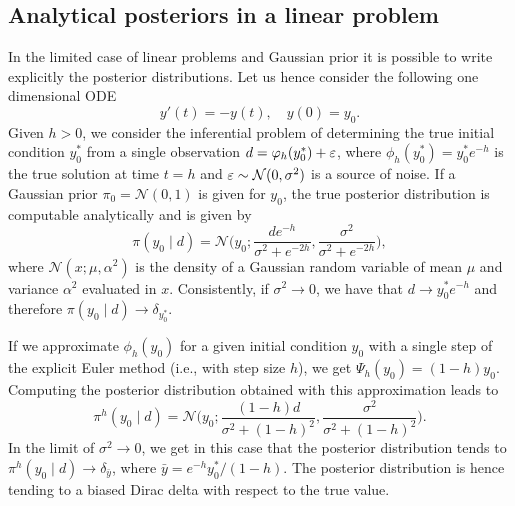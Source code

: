 \documentclass[10pt]{article}
\begin{document}
\subsection{Analytical posteriors in a linear problem}\label{sec:AnalyticalPosterior} In the limited case of linear problems and Gaussian prior it is possible to write explicitly the posterior distributions. Let us hence consider the following one dimensional ODE
\begin{equation}
	y'(t) = -y(t), \quad y(0) = y_0.
\end{equation}
Given $h > 0$, we consider the inferential problem of determining the true initial condition $y_0^*$ from a single observation $d = \varphi_h(y_0^*) + \varepsilon$, where $\phi_h(y_0^*) = y_0^*e^{-h}$ is the true solution at time $t =  h$ and $\varepsilon \sim \mathcal N (0, \sigma^2)$ is a source of noise. If a Gaussian prior $\pi_0 = \mathcal N(0, 1)$ is given for $y_0$, the true posterior distribution is computable analytically and is given by
\begin{equation}\label{eq:ExPosteriorEx}
	\pi(y_0 \mid d) = \mathcal N\Big(y_0; \frac{de^{-h}}{\sigma^2 + e^{-2h}}, \frac{\sigma^2}{\sigma^2 + e^{-2h}}\Big),
\end{equation}
where $\mathcal N(x; \mu, \alpha^2)$ is the density of a Gaussian random variable of mean $\mu$ and variance $\alpha^2$ evaluated in $x$. Consistently, if $\sigma^2 \to 0$, we have that $d \to y_0^*e^{-h}$ and therefore $\pi(y_0 \mid d) \to \delta_{y_0^*}$. 

If we approximate $\phi_h(y_0)$ for a given initial condition $y_0$ with a single step of the explicit Euler method (i.e., with step size $h$), we get $\Psi_h(y_0) = (1 - h)y_0$. Computing the posterior distribution obtained with this approximation leads to 
\begin{equation}\label{eq:ExPosteriorRK}
\pi^h(y_0 \mid d) = \mathcal N\Big(y_0; \frac{(1 - h)d}{\sigma^2 + (1- h)^2}, \frac{\sigma^2}{\sigma^2 + (1 - h)^2}\Big).
\end{equation}
In the limit of $\sigma^2 \to 0$, we get in this case that the posterior distribution tends to $\pi^h(y_0 \mid d) \to \delta_{\bar y}$, where $\bar y = e^{-h}y_0^* / (1 - h)$. The posterior distribution is hence tending to a biased Dirac delta with respect to the true value.
\end{document}
